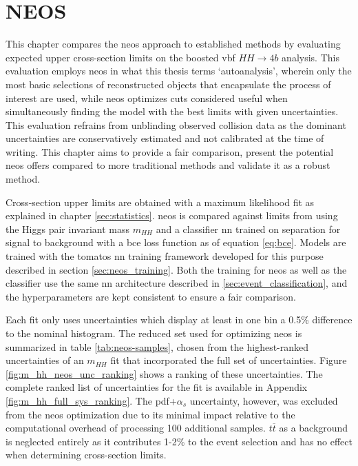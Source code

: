 \chapter{NEOS}
This chapter compares the \ac{neos} approach to established methods by evaluating expected upper cross-section limits on the boosted \ac{vbf} $HH\rightarrow4b$ analysis. This evaluation employs \ac{neos} in what this thesis terms `autoanalysis', wherein only the most basic selections of reconstructed objects that encapsulate the process of interest are used, while \ac{neos} optimizes cuts considered useful when simultaneously finding the model with the best limits with given uncertainties. This evaluation refrains from unblinding observed collision data as the dominant uncertainties are conservatively estimated and not calibrated at the time of writing. This chapter aims to provide a fair comparison, present the potential \ac{neos} offers compared to more traditional methods and validate it as a robust method.

Cross-section upper limits are obtained with a maximum likelihood fit as explained in chapter \ref{sec:statistics}. \ac{neos} is compared against limits from using the Higgs pair invariant mass $m_{HH}$ and a classifier \ac{nn} trained on separation for signal to background with a \ac{bce} loss function as of equation \ref{eq:bce}. Models are trained with the \ac{tomatos} \ac{nn} training framework developed for this purpose \citep{tomatos} described in section \ref{sec:neos_training}. Both the training for \ac{neos} as well as the classifier use the same \ac{nn} architecture described in \ref{sec:event_classification}, and the hyperparameters are kept consistent to ensure a fair comparison.

Each fit only uses uncertainties which display at least in one bin a 0.5\% difference to the nominal histogram. The reduced set used for optimizing \ac{neos} is summarized in table \ref{tab:neos-samples}, chosen from the highest-ranked uncertainties of an $m_{HH}$ fit that incorporated the full set of uncertainties. Figure \ref{fig:m_hh_neos_unc_ranking} shows a ranking of these uncertainties. The complete ranked list of uncertainties for the \mhh fit is available in Appendix \ref{fig:m_hh_full_sys_ranking}. The \ac{pdf}+$\alpha_s$ uncertainty, however, was excluded from the \ac{neos} optimization due to its minimal impact relative to the computational overhead of processing 100 additional samples. $t\overline{t}$ as a background is neglected entirely as it contributes 1-2\% to the event selection and has no effect when determining cross-section limits.

